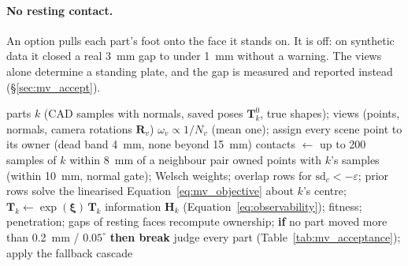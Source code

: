 \paragraph{No resting contact.} An option pulls each part's foot onto the face it stands on. It is
off: on synthetic data it closed a real 3~mm gap to under 1~mm without a warning. The views alone
determine a standing plate, and the gap is measured and reported instead
(\S\ref{sec:mv_accept}).

\begin{algorithm}[htbp]
\caption{Joint refinement of touching parts}
\label{alg:mv_refine}
\begin{algorithmic}[1]
\REQUIRE parts $k$ (CAD samples with normals, saved poses $\mathbf{T}_k^0$, true shapes); views (points, normals, camera rotations $\mathbf{R}_v$)
\STATE $\omega_v\propto1/N_v$ (mean one); assign every scene point to its owner (dead band 4~mm, none beyond 15~mm)
    \STATE contacts $\gets$ up to 200 samples of $k$ within 8~mm of a neighbour
    \REPEAT
      \STATE pair owned points with $k$'s samples (within 10~mm, normal gate); Welsch weights; overlap rows for $\mathrm{sd}_c<-\varepsilon$; prior rows
      \STATE solve the linearised Equation~\ref{eq:mv_objective} about $k$'s centre; $\mathbf{T}_k\gets\exp(\boldsymbol{\xi})\,\mathbf{T}_k$
    \STATE information $\mathbf{H}_k$ (Equation~\ref{eq:observability}); fitness; penetration; gaps of resting faces
  \ENDFOR
  \STATE recompute ownership; \textbf{if} no part moved more than 0.2~mm / $0.05^\circ$ \textbf{then break}
\ENDFOR
\STATE judge every part (Table~\ref{tab:mv_acceptance}); apply the fallback cascade
\end{algorithmic}
\end{algorithm}


